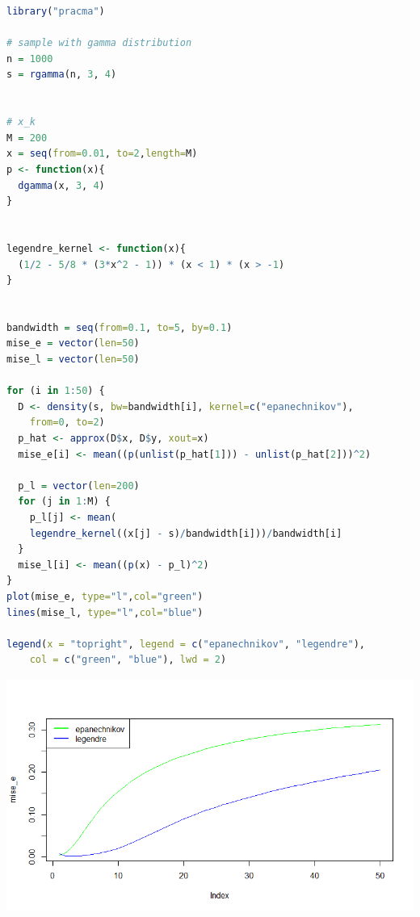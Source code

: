 \documentclass[12pt]{extreport}
\theoremstyle{definiton}
\theoremstyle{definition}
\theoremstyle{definition}
\newcounter{problem}
\renewcommand{\theproblem}{\arabic{problem}}
\newcommand{\problemname}{\color{blue} Задача}
\newenvironment{problem}[1]{
	\addtocounter{problem}{1}\noindent{\large\bfseries \problemname{} \theproblem \,.
		}
}{
	\par\bigskip
}
\begin{document}
\begin{problem}{5}
\begin{lstlisting}[language=R]
library("pracma")

# sample with gamma distribution
n = 1000
s = rgamma(n, 3, 4)


# x_k
M = 200
x = seq(from=0.01, to=2,length=M)
p <- function(x){
  dgamma(x, 3, 4)
}


legendre_kernel <- function(x){
  (1/2 - 5/8 * (3*x^2 - 1)) * (x < 1) * (x > -1)
}


bandwidth = seq(from=0.1, to=5, by=0.1)
mise_e = vector(len=50)
mise_l = vector(len=50)

for (i in 1:50) {
  D <- density(s, bw=bandwidth[i], kernel=c("epanechnikov"),
	from=0, to=2)
  p_hat <- approx(D$x, D$y, xout=x)
  mise_e[i] <- mean((p(unlist(p_hat[1])) - unlist(p_hat[2]))^2)
  
  p_l = vector(len=200)
  for (j in 1:M) {
    p_l[j] <- mean(
	legendre_kernel((x[j] - s)/bandwidth[i]))/bandwidth[i]  
  }
  mise_l[i] <- mean((p(x) - p_l)^2)
}
plot(mise_e, type="l",col="green")
lines(mise_l, type="l",col="blue")

legend(x = "topright", legend = c("epanechnikov", "legendre"), 
	col = c("green", "blue"), lwd = 2) 


\end{lstlisting}
\includegraphics[scale=0.6]{T2_2.png}

\end{problem}
\end{document}
